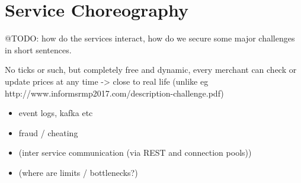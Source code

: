 \section{Service Choreography}
\label{sec:Choreography}
@TODO: how do the services interact, how do we secure some major challenges in short sentences.

No ticks or such, but completely free and dynamic, every merchant can check or update prices at any time -> close to real life (unlike eg http://www.informsrmp2017.com/description-challenge.pdf)

\begin{itemize}
\item event logs, kafka etc
\item fraud / cheating
\item (inter service communication (via REST and connection pools))
\item (where are limits / bottlenecks?)
\end{itemize} 

